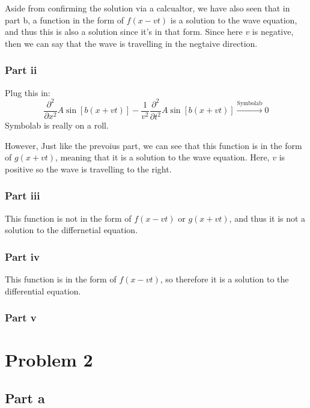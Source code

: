 \documentclass{article}
\theoremstyle{definition}
\numberwithin{equation}{section}
\numberwithin{definition}{section}
\begin{document}
\medskip

Aside from confirming the solution via a calcualtor, we have also seen that in part b, a function in the form of $f(x - vt)$ is a solution to the wave equation, and thus this is also a solution since it's in that form. Since here $v$ is negative, then we can say that the wave is travelling in the negtaive direction.

\subsubsection*{Part ii}
Plug this in:
    \[\frac{\partial^2}{\partial x^2}A\sin[b(x+vt)] - \frac{1}{v^2}\frac{\partial^2}{\partial t^2}A\sin[b(x+vt)] \xrightarrow{\text{Symbolab}} 0\]
Symbolab is really on a roll.

\medskip

However, Just like the prevoius part, we can see that this function is in the form of $g(x + vt)$, meaning that it is a solution to the wave equation. Here, $v$ is positive so the wave is travelling to the right. 

\subsubsection*{Part iii}

This function is not in the form of $f(x - vt)$ or $g(x + vt)$, and thus it is not a solution to the differnetial equation.

\subsubsection*{Part iv}

This function is in the form of $f(x - vt)$, so therefore it is a solution to the differential equation. 

\subsubsection*{Part v}



\section{Problem 2}

\subsection*{Part a}
\end{document}
